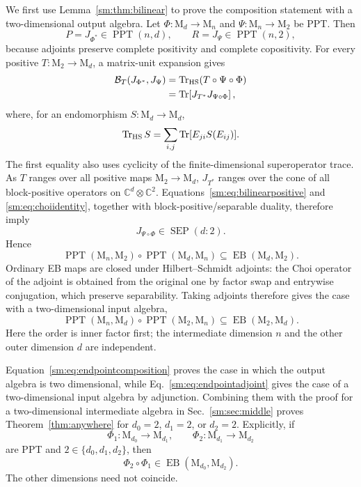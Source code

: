 \documentclass[aps,prl,reprint,superscriptaddress,nofootinbib]{revtex4-2}
\newcommand{\M}{\mathrm{M}}
\newcommand{\C}{\mathbb C}
\newcommand{\Tr}{\operatorname{Tr}}
\newcommand{\PPT}{\operatorname{PPT}}
\newcommand{\EB}{\operatorname{EB}}
\newcommand{\SEP}{\operatorname{SEP}}
\newcommand{\cB}{\mathcal B}
\begin{document}
We first use Lemma~\ref{sm:thm:bilinear} to prove the composition statement
with a two-dimensional output algebra.  Let \(\Phi:\M_d\to\M_n\) and
\(\Psi:\M_n\to\M_2\) be PPT.  Then
\begin{equation}
 P=J_{\Phi^*}\in\PPT(n,d),
 \qquad R=J_\Psi\in\PPT(n,2),
\label{sm:eq:PRchoi}
\end{equation}
because adjoints preserve complete positivity and complete
copositivity.  For every positive \(T:\M_2\to\M_d\), a matrix-unit
expansion gives
\begin{align}
 \cB_T(J_{\Phi^*},J_\Psi)
 &=\Tr_{\rm HS}(T\circ\Psi\circ\Phi)
\nonumber\\
 &=\Tr\!\left[J_{T^*}J_{\Psi\circ\Phi}\right],
\label{sm:eq:choiidentity}
\end{align}
where, for an endomorphism \(S:\M_d\to\M_d\),
\begin{equation}
 \Tr_{\rm HS}S=\sum_{i,j}\Tr[E_{ji}S(E_{ij})].
\label{sm:eq:supertrace}
\end{equation}
The first equality also uses cyclicity of the finite-dimensional
superoperator trace.  As \(T\) ranges over all positive maps
\(\M_2\to\M_d\), \(J_{T^*}\) ranges over the cone of all block-positive
operators
on \(\C^d\otimes\C^2\).  Equations~\eqref{sm:eq:bilinearpositive} and
\eqref{sm:eq:choiidentity}, together with block-positive/separable duality,
therefore imply
\begin{equation}
 J_{\Psi\circ\Phi}\in\SEP(d{:}2).
\label{sm:eq:endpointsep}
\end{equation}
Hence
\begin{equation}
 \PPT(\M_n,\M_2)\circ\PPT(\M_d,\M_n)
 \subseteq\EB(\M_d,\M_2).
\label{sm:eq:endpointcomposition}
\end{equation}
Ordinary EB maps are closed under Hilbert--Schmidt adjoints: the Choi
operator of the adjoint is obtained from the original one by factor swap
and entrywise conjugation, which preserve separability.  Taking adjoints
therefore gives the case with a two-dimensional input algebra,
\begin{equation}
 \PPT(\M_n,\M_d)\circ\PPT(\M_2,\M_n)
 \subseteq\EB(\M_2,\M_d).
\label{sm:eq:endpointadjoint}
\end{equation}
Here the order is inner factor first; the intermediate dimension \(n\) and
the other outer dimension \(d\) are independent.

Equation~\eqref{sm:eq:endpointcomposition} proves the case in which the output
algebra is two dimensional, while Eq.~\eqref{sm:eq:endpointadjoint} gives the
case of a two-dimensional input algebra by adjunction.  Combining them with
the proof for a two-dimensional intermediate algebra in
Sec.~\ref{sm:sec:middle} proves Theorem~\ref{thm:anywhere} for $d_0=2$,
$d_1=2$, or $d_2=2$.  Explicitly, if
\begin{equation}
 \Phi_1:\M_{d_0}\to\M_{d_1},
 \qquad
 \Phi_2:\M_{d_1}\to\M_{d_2}
\label{sm:eq:rectpair}
\end{equation}
are PPT and \(2\in\{d_0,d_1,d_2\}\), then
\begin{equation}
 \Phi_2\circ\Phi_1\in\EB(\M_{d_0},\M_{d_2}).
\label{sm:eq:anywhere}
\end{equation}
The other dimensions need not coincide.
\end{document}
